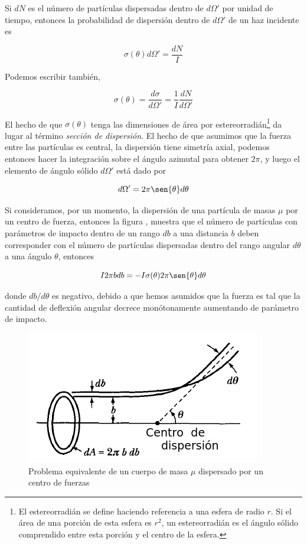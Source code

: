 \documentclass[a4paper,10pt]{article}
\numberwithin{equation}{section}
\begin{document}
Si $dN$ es el número de partículas dispersadas dentro de $d\Omega'$ por unidad
de tiempo, entonces la probabilidad de dispersión dentro de $d\Omega'$ de 
un haz incidente es

\begin{equation}
 \sigma (\theta) d\Omega' = \frac{dN}{I}
 \label{eq:disper2}
\end{equation}

Podemos escribir también,

\begin{equation}
 \sigma(\theta) = \frac{d\sigma}{d\Omega'} = \frac{1}{I}\frac{dN}{d\Omega'}
 \label{eq:disper3}
\end{equation}

El hecho de que $\sigma(\theta)$ tenga las dimensiones de área por estereorradián\footnote{El estereorradián 
se define haciendo referencia a una esfera de radio $r$. Si el área de una porción de esta esfera es $r^2$, un estereorradián es el ángulo sólido comprendido entre esta porción y el centro de la esfera.}
da lugar al término \emph{sección de dispersión}. El hecho de que asumimos que 
la fuerza entre las partículas es central, la dispersión tiene simetría
axial, podemos entonces hacer la integración sobre el ángulo azimutal 
para obtener $2\pi$, y luego el elemento de ángulo sólido $d\Omega'$ está
dado por 

\begin{equation}
 d\Omega' = 2\pi \sen{\theta} d\theta
 \label{eq:disper4}
\end{equation}

Si consideramos, por un momento, la dispersión de una partícula de 
masas $\mu$ por un centro de fuerza, entonces la figura ,
muestra que el número de partículas con parámetros de impacto dentro de 
un rango $db$ a una distancia $b$ deben corresponder con el número de 
partículas dispersadas dentro del rango angular $d\theta$ a una ángulo $\theta$,
entonces

\begin{equation}
 I2\pi b db = - I \sigma(\theta)2\pi\sen{\theta}d\theta
 \label{eq:disper5}
\end{equation}

donde $db/d\theta$ es negativo, debido a que hemos asumidos que la fuerza 
es tal que la cantidad de deflexión angular decrece monótonamente aumentando 
de parámetro de impacto. 

\begin{figure}[H]
 \center
 \includegraphics[scale=0.5]{problema3fig2}
 \caption{Problema equivalente de un cuerpo de masa $\mu$ dispersado 
 por un centro de fuerzas}
 \label{fig:problema3fig2}
\end{figure}
\end{document}
